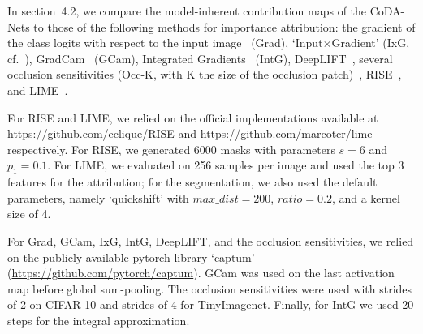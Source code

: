 In section~4.2, we compare the model-inherent contribution maps of the CoDA-Nets to those of the following methods for importance attribution:
 the gradient of the class logits with respect to the input image~ (Grad), `Input$\times$Gradient' (IxG, cf.~), GradCam~ (GCam), Integrated Gradients~ (IntG), DeepLIFT~,
    several occlusion sensitivities (Occ-K, with K the size of the occlusion patch)~,
    RISE~, and LIME~.

For RISE and LIME, we relied on the official implementations available at \url{https://github.com/eclique/RISE} and 
\url{https://github.com/marcotcr/lime} respectively. For RISE, we generated 6000 masks with parameters $s=6$ and $p_1=0.1$.
For LIME, we evaluated on 256 samples per image and used the top 3 features for the attribution;
    for the segmentation, we also used the default parameters, namely `quickshift' with $max\_dist=200$, $ratio=0.2$, and a kernel size of 4.

For Grad, GCam, IxG, IntG, DeepLIFT, and the occlusion sensitivities,
    we relied on the publicly available pytorch library `captum' (\url{https://github.com/pytorch/captum}).
GCam was used on the last activation map before global sum-pooling.
The occlusion sensitivities were used with 
    strides of 2 on CIFAR-10 and strides of 4 for TinyImagenet.
Finally, for IntG we used 20 steps for the integral approximation.
